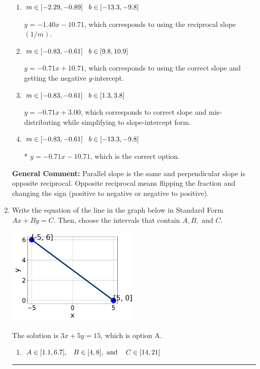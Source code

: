 \documentclass{extbook}[14pt]
\newcommand{\litem}[1]{\item #1

\rule{\textwidth}{0.4pt}}
\begin{document}
\begin{enumerate}
{\begin{enumerate}[label=\Alph*.]
 $y = 0.71x + 0.71$, which corresponds to using the negative slope.
\item \( m \in [-2.29, -0.89] \hspace*{3mm} b \in [-13.3, -9.8] \)

 $y = -1.40x - 10.71$, which corresponds to using the reciprocal slope $(1/m)$.
\item \( m \in [-0.83, -0.61] \hspace*{3mm} b \in [9.8, 10.9] \)

 $y = -0.71x + 10.71$, which corresponds to using the correct slope and getting the negative $y$-intercept.
\item \( m \in [-0.83, -0.61] \hspace*{3mm} b \in [1.3, 3.8] \)

 $y = -0.71x + 3.00$, which corresponds to correct slope and mis-distributing while simplifying to slope-intercept form.
\item \( m \in [-0.83, -0.61] \hspace*{3mm} b \in [-13.3, -9.8] \)

* $y = -0.71x - 10.71$, which is the correct option.
\end{enumerate}

\textbf{General Comment:} Parallel slope is the same and perpendicular slope is opposite reciprocal. Opposite reciprocal means flipping the fraction and changing the sign (positive to negative or negative to positive).
}
\litem{
Write the equation of the line in the graph below in Standard Form $Ax+By=C$. Then, choose the intervals that contain $A, B, \text{ and } C$.

\begin{center}
    \includegraphics[width=0.5\textwidth]{../Figures/linearGraphToStandardCopyB.png}
\end{center}


The solution is \( 3x + 5y = 15 \), which is option A.\begin{enumerate}[label=\Alph*.]
\item \( A \in [1.1, 6.7], \hspace{3mm} B \in [4, 8], \text{ and } \hspace{3mm} C \in [14, 21] \)


\end{enumerate}}
\end{enumerate}
\end{document}
